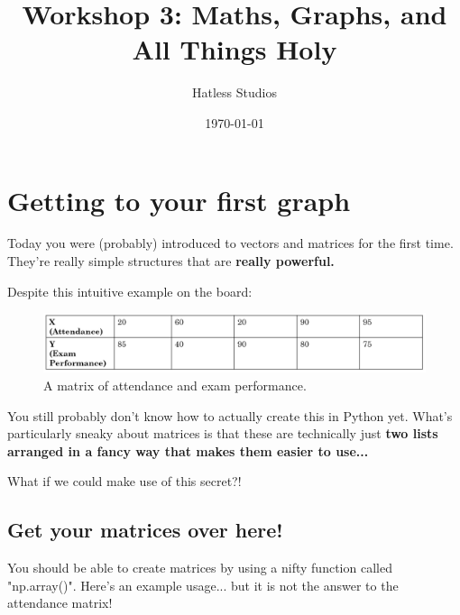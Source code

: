 \documentclass{article}
\title{Workshop 3: Maths, Graphs, and All Things Holy}
\author{Hatless Studios}
\date{\today}
\begin{document}
    \maketitle
    
    \section{Getting to your first graph}
    Today you were (probably) introduced to vectors and matrices for the first time. They're really simple structures that are \bfseries really \mdseries powerful.
    
    Despite this intuitive example on the board:

    \begin{figure}[H]
        \begin{center}
            \includegraphics[width=\textwidth]{../figures/attendance-example}
            \caption{A matrix of attendance and exam performance.}
        \end{center}
        \label{fig:attendance}
    \end{figure}
    
    You still probably don't know how to actually create this in Python yet. What's particularly sneaky about matrices is that these are technically just \bfseries two lists \mdseries arranged in a fancy way that makes them easier to use...
    
    What if we could make use of this secret?!

    \subsection{Get your matrices over here!}
    You should be able to create matrices by using a nifty function called "np.array()". Here's an example usage... but it is not the answer to the attendance matrix!
    
\end{document}
